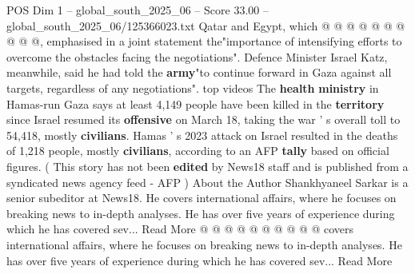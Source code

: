 \begin{textsample}{POS Dim 1 – global\_south\_2025\_06 – Score 33.00 – global\_south\_2025\_06/125366023.txt}
Qatar and Egypt, which @ @ @ @ @ @ @ @ @ @, emphasised in a joint statement the"importance of intensifying efforts to overcome the obstacles facing the negotiations".
Defence Minister Israel Katz, meanwhile, said he had told the \textbf{army}"to continue forward in Gaza against all targets, regardless of any negotiations". top videos The \textbf{health} \textbf{ministry} in Hamas-run Gaza says at least 4,149 people have been killed in the \textbf{territory} since Israel resumed its \textbf{offensive} on March 18, taking the war ' s overall toll to 54,418, mostly \textbf{civilians}.
Hamas ' s 2023 attack on Israel resulted in the deaths of 1,218 people, mostly \textbf{civilians}, according to an AFP \textbf{tally} based on official figures. ( This story has not been \textbf{edited} by News18 staff and is published from a syndicated news agency feed - AFP ) About the Author Shankhyaneel Sarkar is a senior subeditor at News18.
He covers international affairs, where he focuses on breaking news to in-depth analyses.
He has over five years of experience during which he has covered sev...
Read More @ @ @ @ @ @ @ @ @ @ covers international affairs, where he focuses on breaking news to in-depth analyses.
He has over five years of experience during which he has covered sev...
Read More

\end{textsample}
